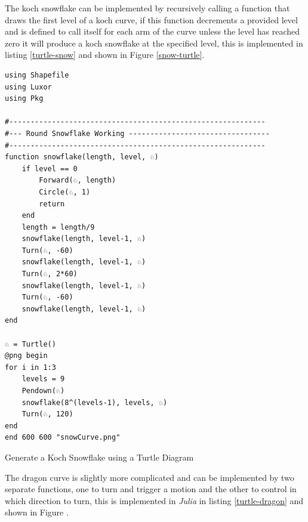 \documentclass[a4paper,11pt,twoside]{article}
\begin{document}
The koch snowflake can be implemented by recursively calling a function that draws the first level of a koch curve, if this function decrements a provided level and is defined to call itself for each arm of the curve unless the level has reached zero it will produce a koch snowflake at the specified level, this is implemented in listing \ref{turtle-snow} and shown in Figure \ref{snow-turtle}.

\begin{listing}[htbp]
\begin{verbatim}
using Shapefile
using Luxor
using Pkg

#------------------------------------------------------------
#--- Round Snowflake Working ---------------------------------
#------------------------------------------------------------
function snowflake(length, level, ♘)
    if level == 0
        Forward(♘, length)
        Circle(♘, 1)
        return
    end
    length = length/9
    snowflake(length, level-1, ♘)
    Turn(♘, -60)
    snowflake(length, level-1, ♘)
    Turn(♘, 2*60)
    snowflake(length, level-1, ♘)
    Turn(♘, -60)
    snowflake(length, level-1, ♘)
end

♘ = Turtle()
@png begin
for i in 1:3
    levels = 9
    Pendown(♘)
    snowflake(8^(levels-1), levels, ♘)
    Turn(♘, 120)
end
end 600 600 "snowCurve.png"

\end{verbatim}
\caption{\label{turtle-snow}Generate a Koch Snowflake using a Turtle Diagram}
\end{listing}

The dragon curve is slightly more complicated and can be implemented by two separate functions, one to turn and trigger a motion and the other to control in which direction to turn, this is implemented in \emph{Julia} in listing \ref{turtle-dragon}  and shown in Figure .
\end{document}

